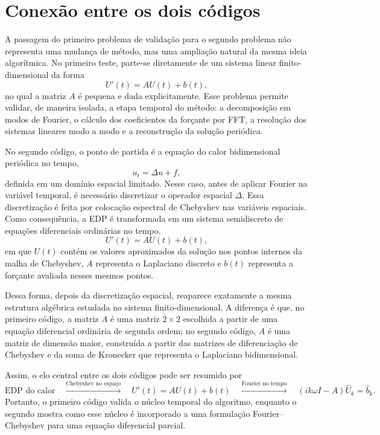 \section{Conexão entre os dois códigos}
\label{sec:conexao-codigos}

A passagem do primeiro problema de validação para o segundo problema não representa uma mudança de método, mas uma ampliação natural da mesma ideia algorítmica. No primeiro teste, parte-se diretamente de um sistema linear finito-dimensional da forma
\[
U'(t)=AU(t)+b(t),
\]
no qual a matriz \(A\) é pequena e dada explicitamente. Esse problema permite validar, de maneira isolada, a etapa temporal do método: a decomposição em modos de Fourier, o cálculo dos coeficientes da forçante por FFT, a resolução dos sistemas lineares modo a modo e a reconstrução da solução periódica.

No segundo código, o ponto de partida é a equação do calor bidimensional periódica no tempo,
\[
u_t=\Delta u+f,
\]
definida em um domínio espacial limitado. Nesse caso, antes de aplicar Fourier na variável temporal, é necessário discretizar o operador espacial \(\Delta\). Essa discretização é feita por colocação espectral de Chebyshev nas variáveis espaciais. Como consequência, a EDP é transformada em um sistema semidiscreto de equações diferenciais ordinárias no tempo,
\[
U'(t)=AU(t)+b(t),
\]
em que \(U(t)\) contém os valores aproximados da solução nos pontos internos da malha de Chebyshev, \(A\) representa o Laplaciano discreto e \(b(t)\) representa a forçante avaliada nesses mesmos pontos.

Dessa forma, depois da discretização espacial, reaparece exatamente a mesma estrutura algébrica estudada no sistema finito-dimensional. A diferença é que, no primeiro código, a matriz \(A\) é uma matriz \(2\times2\) escolhida a partir de uma equação diferencial ordinária de segunda ordem; no segundo código, \(A\) é uma matriz de dimensão maior, construída a partir das matrizes de diferenciação de Chebyshev e da soma de Kronecker que representa o Laplaciano bidimensional.

Assim, o elo central entre os dois códigos pode ser resumido por
\[
\text{EDP do calor}
\quad \xrightarrow{\text{Chebyshev no espaço}} \quad
U'(t)=AU(t)+b(t)
\quad \xrightarrow{\text{Fourier no tempo}} \quad
(ik\omega I-A)\widehat{U}_k=\widehat{b}_k.
\]
Portanto, o primeiro código valida o núcleo temporal do algoritmo, enquanto o segundo mostra como esse núcleo é incorporado a uma formulação Fourier--Chebyshev para uma equação diferencial parcial.

